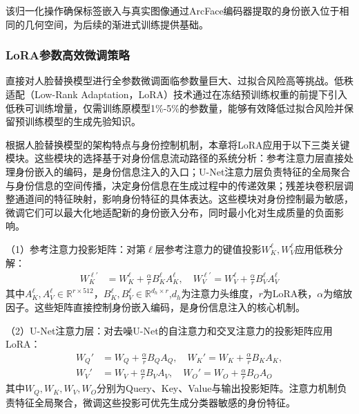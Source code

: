 该归一化操作确保标签嵌入与真实图像通过ArcFace编码器提取的身份嵌入位于相同的几何空间，为后续的渐进式训练提供基础。

\subsubsection{LoRA参数高效微调策略}

直接对人脸替换模型进行全参数微调面临参数量巨大、过拟合风险高等挑战。低秩适配（Low-Rank Adaptation，LoRA）技术通过在冻结预训练权重的前提下引入低秩可训练增量，仅需训练原模型1\%-5\%的参数量，能够有效降低过拟合风险并保留预训练模型的生成先验知识。

根据人脸替换模型的架构特点与身份控制机制，本章将LoRA应用于以下三类关键模块。这些模块的选择基于对身份信息流动路径的系统分析：参考注意力层直接处理身份嵌入的编码，是身份信息注入的入口；U-Net注意力层负责特征的全局聚合与身份信息的空间传播，决定身份信息在生成过程中的传递效果；残差块卷积层调整通道间的特征映射，影响身份特征的具体表达。这些模块对身份控制最为敏感，微调它们可以最大化地适配新的身份嵌入分布，同时最小化对生成质量的负面影响。

（1）参考注意力投影矩阵：对第$\ell$层参考注意力的键值投影$W_K^{\ell}, W_V^{\ell}$应用低秩分解：
\begin{equation}\label{eq:mia_lora_ref_proj}
\begin{aligned}
    W_K^{\ell\prime} &= W_K^{\ell} + \frac{\alpha}{r} B_K^{\ell} A_K^{\ell}, \quad
    W_V^{\ell\prime} = W_V^{\ell} + \frac{\alpha}{r} B_V^{\ell} A_V^{\ell}
\end{aligned}
\end{equation}
其中$A_K^{\ell}, A_V^{\ell}\in\mathbb{R}^{r\times 512}$，$B_K^{\ell}, B_V^{\ell}\in\mathbb{R}^{d_h\times r}$,$d_h$为注意力头维度，$r$为LoRA秩，$\alpha$为缩放因子。这些矩阵直接控制身份嵌入编码，是身份信息注入的核心机制。

（2）U-Net注意力层：对去噪U-Net的自注意力和交叉注意力的投影矩阵应用LoRA：
\begin{equation}\label{eq:mia_lora_attn}
\begin{aligned}
    W_Q' &= W_Q + \frac{\alpha}{r} B_Q A_Q, \quad
    W_K' = W_K + \frac{\alpha}{r} B_K A_K, \\
    W_V' &= W_V + \frac{\alpha}{r} B_V A_V, \quad
    W_O' = W_O + \frac{\alpha}{r} B_O A_O
\end{aligned}
\end{equation}
其中$W_Q, W_K, W_V, W_O$分别为Query、Key、Value与输出投影矩阵。注意力机制负责特征全局聚合，微调这些投影可优先生成分类器敏感的身份特征。

